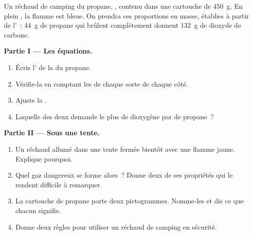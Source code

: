 \begin{problem}
\label{pb:g8:combustion-and-fuels:1}
Un réchaud de camping  du propane, , contenu dans une
cartouche de \qty{450}{g}. En plein , la flamme est bleue. On prendra
ces proportions en masse, établies à partir de l'~:
\qty{44}{g} de propane qui brûlent complètement donnent \qty{132}{g} de
dioxyde de carbone.

\medskip
\noindent\textbf{Partie I --- Les équations.}
\begin{enumerate}
  \item Écris l' de la  du propane.
  \item Vérifie-la en comptant les  de chaque sorte de chaque côté.
  \item Ajuste la 
        . %
  \item Laquelle des deux demande le plus de dioxygène par  de
        propane~?
\end{enumerate}

\medskip
\noindent\textbf{Partie II --- Sous une tente.}
\begin{enumerate}[resume]
  \item Un réchaud allumé dans une tente fermée  bientôt avec une
        flamme jaune. Explique pourquoi.
  \item Quel gaz dangereux se forme alors~? Donne deux de ses propriétés
        qui le rendent difficile à remarquer.
  \item La cartouche de propane porte deux pictogrammes. Nomme-les et dis
        ce que chacun signifie.
  \item Donne deux règles pour utiliser un réchaud de camping en
        sécurité.
\end{enumerate}


\end{problem}
